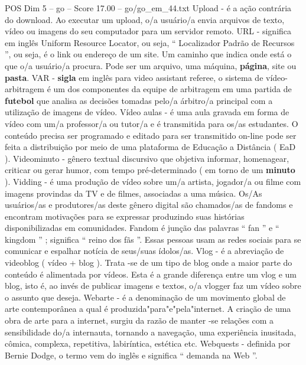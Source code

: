 \begin{textsample}{POS Dim 5 – go – Score 17.00 – go/go\_em\_44.txt}
Upload - é a ação contrária do download.
Ao executar um upload, o/a usuário/a envia arquivos de texto, vídeo ou imagens do seu computador para um servidor remoto.
URL - significa em inglês Uniform Resource Locator, ou seja, “ Localizador Padrão de Recursos ”, ou seja, é o link ou endereço de um site.
Um caminho que indica onde está o que o/a usuário/a procura.
Pode ser um arquivo, uma máquina, \textbf{página}, site ou \textbf{pasta}.
VAR - \textbf{sigla} em inglês para video assistant referee, o sistema de vídeo-arbitragem é um dos componentes da equipe de arbitragem em uma partida de \textbf{futebol} que analisa as decisões tomadas pelo/a árbitro/a principal com a utilização de imagens de vídeo.
Vídeo aulas - é uma aula gravada em forma de vídeo com um/a professor/a ou tutor/a e é transmitida para os/as estudantes.
O conteúdo precisa ser programado e editado para ser transmitido on-line pode ser feita a distribuição por meio de uma plataforma de Educação a Distância ( EaD ).
Videominuto - gênero textual discursivo que objetiva informar, homenagear, criticar ou gerar humor, com tempo pré-determinado ( em torno de um \textbf{minuto} ).
Vidding - é uma produção de vídeo sobre um/a artista, jogador/a ou filme com imagens provindas da TV e de filmes, associadas a uma música.
Os/As usuários/as e produtores/as deste gênero digital são chamados/as de fandoms e encontram motivações para se expressar produzindo suas histórias disponibilizadas em comunidades.
Fandom é junção das palavras “ fan ” e “ kingdom ” ; significa “ reino dos fãs ”.
Essas pessoas usam as redes sociais para se comunicar e espalhar notícia de seus/suas ídolos/as.
Vlog - é a abreviação de videoblog ( vídeo + blog ).
Trata -se de um tipo de blog onde a maior parte do conteúdo é alimentada por vídeos.
Esta é a grande diferença entre um vlog e um blog, isto é, ao invés de publicar imagens e textos, o/a vlogger faz um vídeo sobre o assunto que deseja.
Webarte - é a denominação de um movimento global de arte contemporânea a qual é produzida"para"e"pela"internet.
A criação de uma obra de arte para a internet, surgiu da razão de manter -se relações com a sensibilidade do/a internauta, tornando a navegação, uma experiência inusitada, cômica, complexa, repetitiva, labiríntica, estética etc.
Webquests - definida por Bernie Dodge, o termo vem do inglês e significa “ demanda na Web ”.

\end{textsample}
